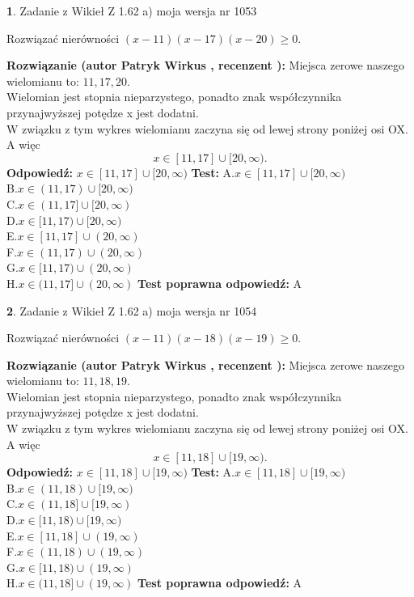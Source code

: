\documentclass[12pt, a4paper]{article}
\theoremstyle{definition} %
\newtheorem{zad}{}
\newcommand{\zadStart}[1]{\begin{zad}#1\newline}
\newcommand{\zadStop}{\end{zad}}
\newcommand{\rozwStart}[2]{\noindent \textbf{Rozwiązanie (autor #1 , recenzent #2): }\newline}
\newcommand{\rozwStop}{\newline}
\newcommand{\odpStart}{\noindent \textbf{Odpowiedź:}\newline}
\newcommand{\odpStop}{\newline}
\newcommand{\testStart}{\noindent \textbf{Test:}\newline}
\newcommand{\testStop}{\newline}
\newcommand{\kluczStart}{\noindent \textbf{Test poprawna odpowiedź:}\newline}
\newcommand{\kluczStop}{\newline}
\begin{document}
\zadStart{Zadanie z Wikieł Z 1.62 a) moja wersja nr 1053}

Rozwiązać nierówności $(x-11)(x-17)(x-20)\ge0$.
\zadStop
\rozwStart{Patryk Wirkus}{}
Miejsca zerowe naszego wielomianu to: $11, 17, 20$.\\
Wielomian jest stopnia nieparzystego, ponadto znak współczynnika przy\linebreak najwyższej potędze x jest dodatni.\\ W związku z tym wykres wielomianu zaczyna się od lewej strony poniżej osi OX. A więc $$x \in [11,17] \cup [20,\infty).$$
\rozwStop
\odpStart
$x \in [11,17] \cup [20,\infty)$
\odpStop
\testStart
A.$x \in [11,17] \cup [20,\infty)$\\
B.$x \in (11,17) \cup [20,\infty)$\\
C.$x \in (11,17] \cup [20,\infty)$\\
D.$x \in [11,17) \cup [20,\infty)$\\
E.$x \in [11,17] \cup (20,\infty)$\\
F.$x \in (11,17) \cup (20,\infty)$\\
G.$x \in [11,17) \cup (20,\infty)$\\
H.$x \in (11,17] \cup (20,\infty)$
\testStop
\kluczStart
A
\kluczStop



\zadStart{Zadanie z Wikieł Z 1.62 a) moja wersja nr 1054}

Rozwiązać nierówności $(x-11)(x-18)(x-19)\ge0$.
\zadStop
\rozwStart{Patryk Wirkus}{}
Miejsca zerowe naszego wielomianu to: $11, 18, 19$.\\
Wielomian jest stopnia nieparzystego, ponadto znak współczynnika przy\linebreak najwyższej potędze x jest dodatni.\\ W związku z tym wykres wielomianu zaczyna się od lewej strony poniżej osi OX. A więc $$x \in [11,18] \cup [19,\infty).$$
\rozwStop
\odpStart
$x \in [11,18] \cup [19,\infty)$
\odpStop
\testStart
A.$x \in [11,18] \cup [19,\infty)$\\
B.$x \in (11,18) \cup [19,\infty)$\\
C.$x \in (11,18] \cup [19,\infty)$\\
D.$x \in [11,18) \cup [19,\infty)$\\
E.$x \in [11,18] \cup (19,\infty)$\\
F.$x \in (11,18) \cup (19,\infty)$\\
G.$x \in [11,18) \cup (19,\infty)$\\
H.$x \in (11,18] \cup (19,\infty)$
\testStop
\kluczStart
A
\kluczStop
\end{document}
